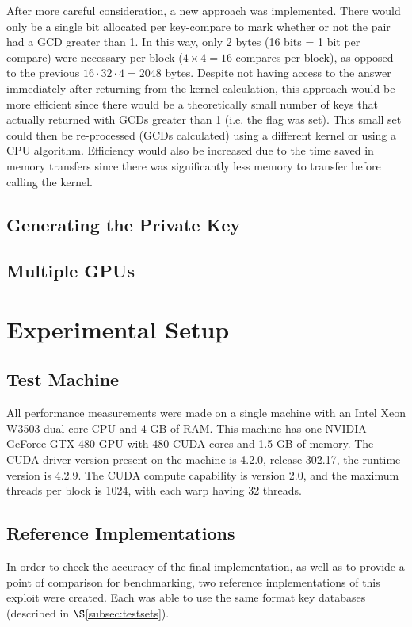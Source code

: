 \documentclass[smallextended]{svjour3}       %
\begin{document}
After more careful consideration, a new approach was implemented. There would 
only be a single bit allocated per key-compare to mark whether or not the pair 
had a GCD greater than 1. In this way, only 2 bytes (16 bits = 1 bit per 
compare) were necessary per block ($4\times4 = 16$ compares per block), as 
opposed to the previous $16 \cdot 32 \cdot 4 = 2048$ bytes. Despite not having access 
to the answer immediately after returning from the kernel calculation, this 
approach would be more efficient since there would be a theoretically small 
number of keys that actually returned with GCDs greater than 1 (i.e. the flag 
was set). This small set could then be re-processed (GCDs calculated) using a 
different kernel or using a CPU algorithm. Efficiency would also be increased 
due to the time saved in memory transfers since there was significantly less 
memory to transfer before calling the kernel.

\subsection{Generating the Private Key}
\label{subsec:private}

\subsection{Multiple GPUs}
\label{subsec:multiGPU}


\section{Experimental Setup}
\label{sec:expsetup}

\subsection{Test Machine}
\label{subsec:testmachine}
All performance measurements were made on a single machine with an Intel Xeon 
W3503 dual-core CPU and 4 GB of RAM. This machine has one NVIDIA GeForce
GTX 480 GPU with 480 CUDA cores and 1.5 GB of memory. The CUDA driver 
version present on the machine is 4.2.0, release 302.17, the runtime version is
4.2.9. The CUDA compute capability is version 2.0, and the maximum threads per 
block is 1024, with each warp having 32 threads.

\subsection{Reference Implementations}
\label{subsec:refimpl}
In order to check the accuracy of the final implementation, as well as to 
provide a point of comparison for benchmarking, two reference implementations 
of this exploit were created. Each was able to use the same format key 
databases (described in $\S$\ref{subsec:testsets}). 
\end{document}

